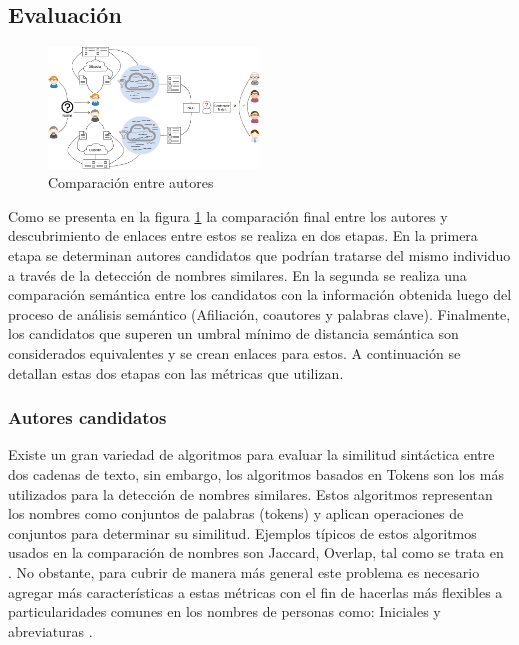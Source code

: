 \documentclass[conference]{IEEEtran}
\begin{document}
\subsection{Evaluación}

\begin{figure}[!t]
\centering
\includegraphics[width=0.5\textwidth]{proceso}
\caption{Comparaci\'on entre autores}
\label{fig:comparacion}
\end{figure}

Como se presenta en la figura \ref{fig:comparacion} la comparación final entre los autores y descubrimiento de enlaces entre estos se realiza en dos etapas. En la primera etapa se determinan autores candidatos que podrían tratarse del mismo individuo a través de la detección de nombres similares. En la segunda se realiza una comparación semántica entre los candidatos con la información obtenida luego del proceso de análisis semántico (Afiliación, coautores y palabras clave). Finalmente, los candidatos que superen un umbral mínimo de distancia semántica son considerados equivalentes y se crean enlaces para estos. A continuación se detallan estas dos etapas con las métricas que utilizan.

\subsubsection{Autores candidatos}
Existe un gran variedad de algoritmos para evaluar la similitud sintáctica entre dos cadenas de texto, sin embargo, los algoritmos basados en Tokens son los más utilizados para la detección de nombres similares. Estos algoritmos representan los nombres como conjuntos de palabras (tokens) y aplican operaciones de conjuntos para determinar su similitud. Ejemplos típicos de estos algoritmos usados en la comparación de nombres son Jaccard, Overlap, tal como se trata en  \cite{huynh2013vietnamese}. No obstante, para cubrir de manera más general este problema es necesario agregar más características a estas métricas con el fin de hacerlas más flexibles a particularidades comunes en los nombres de personas como: Iniciales y abreviaturas \cite{shoaib2015improving}.
\end{document}
